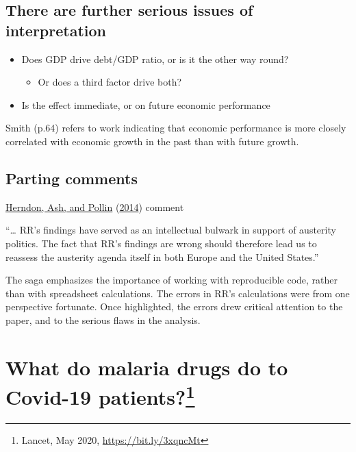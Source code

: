 \documentclass[
  10pt,
  b5paper]{book}
\providecommand{\tightlist}{%
  \setlength{\itemsep}{0pt}\setlength{\parskip}{0pt}}
\begin{document}
\hypertarget{there-are-further-serious-issues-of-interpretation}{%
\subsection*{There are further serious issues of interpretation}\label{there-are-further-serious-issues-of-interpretation}}

\begin{itemize}
\tightlist
\item
  Does GDP drive debt/GDP ratio, or is it the other way round?

  \begin{itemize}
  \tightlist
  \item
    Or does a third factor drive both?
  \end{itemize}
\item
  Is the effect immediate, or on future economic performance
\end{itemize}

Smith (p.64) refers to work indicating that economic performance
is more closely correlated with economic growth in the past than
with future growth.

\hypertarget{parting-comments}{%
\subsection*{Parting comments}\label{parting-comments}}

\protect\hyperlink{ref-herndon2014does}{Herndon, Ash, and Pollin} (\protect\hyperlink{ref-herndon2014does}{2014}) comment

``\ldots{} RR's findings have served as an intellectual bulwark in support of austerity politics. The fact that RR's findings are wrong should therefore lead us to reassess the austerity agenda itself in both Europe and the United States.''

The saga emphasizes the importance of working with reproducible code,
rather than with spreadsheet calculations.
The errors in RR's calculations were from one perspective fortunate.
Once highlighted, the errors drew critical attention to the paper,
and to the serious flaws in the analysis.

\hypertarget{sec:lancet}{%
\section[What do malaria drugs do to Covid-19 patients?]{\texorpdfstring{What do malaria drugs do to Covid-19 patients?\footnote{Lancet, May 2020, \url{https://bit.ly/3xqncMt}}}{What do malaria drugs do to Covid-19 patients?}}\label{sec:lancet}}
\end{document}
